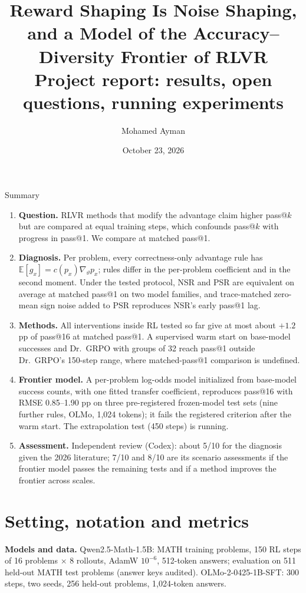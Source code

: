 \documentclass[10pt]{article}
\title{\textbf{Reward Shaping Is Noise Shaping,\\ and a Model of the Accuracy--Diversity Frontier of RLVR}\\[4pt]\large Project report: results, open questions, running experiments}
\author{Mohamed Ayman}
\date{October 23, 2026}
\newcommand{\E}{\mathbb{E}}
\begin{document}
\maketitle
\vspace{-10pt}

\begin{key}{Summary}
\begin{enumerate}
\item \textbf{Question.} RLVR methods that modify the advantage claim higher pass@$k$ but are compared at equal training steps, which confounds pass@$k$ with progress in pass@1. We compare at matched pass@1.
\item \textbf{Diagnosis.} Per problem, every correctness-only advantage rule has $\E[g_x]=c(p_x)\nabla_\vartheta p_x$; rules differ in the per-problem coefficient and in the second moment. Under the tested protocol, NSR and PSR are equivalent on average at matched pass@1 on two model families, and trace-matched zero-mean sign noise added to PSR reproduces NSR's early pass@1 lag.
\item \textbf{Methods.} All interventions inside RL tested so far give at most about $+1.2$ pp of pass@16 at matched pass@1. A supervised warm start on base-model successes and Dr.\ GRPO with groups of 32 reach pass@1 outside Dr.\ GRPO's 150-step range, where matched-pass@1 comparison is undefined.
\item \textbf{Frontier model.} A per-problem log-odds model initialized from base-model success counts, with one fitted transfer coefficient, reproduces pass@16 with RMSE 0.85--1.90 pp on three pre-registered frozen-model test sets (nine further rules, OLMo, 1,024 tokens); it fails the registered criterion after the warm start. The extrapolation test (450 steps) is running.
\item \textbf{Assessment.} Independent review (Codex): about 5/10 for the diagnosis given the 2026 literature; 7/10 and 8/10 are its scenario assessments if the frontier model passes the remaining tests and if a method improves the frontier across scales.
\end{enumerate}
\end{key}

\section{Setting, notation and metrics}
\textbf{Models and data.} Qwen2.5-Math-1.5B: MATH training problems, 150 RL steps of 16 problems $\times$ 8 rollouts, AdamW $10^{-6}$, 512-token answers; evaluation on 511 held-out MATH test problems (answer keys audited). OLMo-2-0425-1B-SFT: 300 steps, two seeds, 256 held-out problems, 1,024-token answers.
\end{document}
